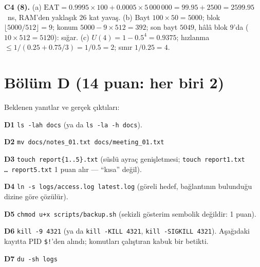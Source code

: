 \documentclass[11pt,a4paper]{article}
\begin{document}
\textbf{C4 (8).} (a) $\text{EAT} = 0.9995 \times 100 + 0.0005 \times 5\,000\,000 = 99.95 + 2500 = 2599.95$~ns, RAM'den yaklaşık $26$ kat yavaş. (b) Bayt $100 \times 50 = 5000$; blok $\lfloor 5000/512 \rfloor = 9$; konum $5000 - 9 \times 512 = 392$; son bayt $5049$, hâlâ blok $9$'da ($10 \times 512 = 5120$): sığar. (c) $U(4) = 1 - 0.5^{4} = 0.9375$; hızlanma $\le 1/(0.25 + 0.75/3) = 1/0.5 = 2$; sınır $1/0.25 = 4$.

\section*{Bölüm D (14 puan: her biri 2)}
Beklenen yanıtlar ve gerçek çıktıları:

\textbf{D1} \texttt{ls -lah docs} (ya da \texttt{ls -la -h docs}).

\textbf{D2} \texttt{mv docs/notes\_01.txt docs/meeting\_01.txt}

\textbf{D3} \texttt{touch report\{1..5\}.txt} (süslü ayraç genişletmesi; \texttt{touch report1.txt \dots\ report5.txt} 1 puan alır --- ``kısa'' değil).

\textbf{D4} \texttt{ln -s logs/access.log latest.log} (göreli hedef, bağlantının bulunduğu dizine göre çözülür).

\textbf{D5} \texttt{chmod u+x scripts/backup.sh} (sekizli gösterim sembolik değildir: 1 puan).

\textbf{D6} \texttt{kill -9 4321} (ya da \texttt{kill -KILL 4321}, \texttt{kill -SIGKILL 4321}). Aşağıdaki kayıtta PID \texttt{\$!}'den alındı; komutları çalıştıran kabuk bir betikti.

\textbf{D7} \texttt{du -sh logs}


\end{document}
